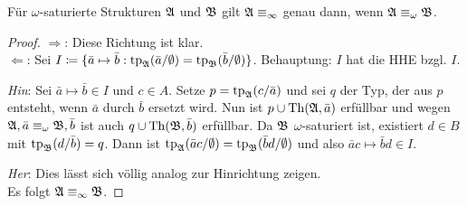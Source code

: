 \begin{satz}
	Für $\omega$-saturierte Strukturen $\mathfrak{A}$ und $\mathfrak{B}$ gilt $\mathfrak{A}\equiv_\infty$ genau dann, wenn $\mathfrak{A} \equiv_\omega \mathfrak{B}$.
\end{satz}
\begin{proof}
	$\Rightarrow$: Diese Richtung ist klar.
	\\
	$\Leftarrow$: Sei $I\coloneqq \{\bar{a}\mapsto\bar{b} : \operatorname{tp}_{\mathfrak{A}}(\bar{a}/\emptyset) = \operatorname{tp}_{\mathfrak{B}}(\bar{b}/\emptyset)\}$. Behauptung: $I$ hat die HHE bzgl. $I$.
	
	\textit{Hin}: Sei $\bar{a}\mapsto\bar{b}\in I$ und $c\in A$. Setze $p=\operatorname{tp}_{\mathfrak{A}}(c/\bar{a})$ und sei $q$ der Typ, der aus $p$ entsteht, wenn $\bar{a}$ durch $\bar{b}$ ersetzt wird. Nun ist $p\cup \operatorname{Th}(\mathfrak{A},\bar{a})$ erfüllbar und wegen $\mathfrak{A},\bar{a}\equiv_\omega \mathfrak{B},\bar{b}$ ist auch $q\cup \operatorname{Th}(\mathfrak{B},\bar{b})$ erfüllbar.
	Da $\mathfrak{B}$ $\omega$-saturiert ist, existiert $d\in B$ mit $\operatorname{tp}_{\mathfrak{B}}(d/\bar{b})=q$. Dann ist $\operatorname{tp}_{\mathfrak{A}}(\bar{a}c/\emptyset)=\operatorname{tp}_{\mathfrak{B}}(\bar{b}d/\emptyset)$ und also $\bar{a}c\mapsto\bar{b}d\in I$.
	
	\textit{Her}: Dies lässt sich völlig analog zur Hinrichtung zeigen.
	\\
	Es folgt $\mathfrak{A} \equiv_\infty \mathfrak{B}$.
\end{proof}












